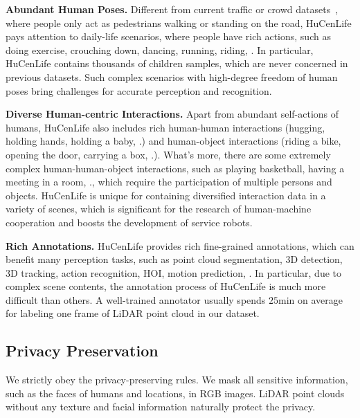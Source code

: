 \textbf{Abundant Human Poses.} 
Different from current traffic or crowd datasets~\cite{sun2020scalability,caesar2020nuscenes,cong2022stcrowd}, where people only act as pedestrians walking or standing on the road, HuCenLife pays attention to daily-life scenarios, where people have rich actions, such as doing exercise, crouching down, dancing, running, riding, \etc. In particular, HuCenLife contains thousands of children samples, which are never concerned in previous datasets. Such complex scenarios with high-degree freedom of human poses bring challenges for accurate perception and recognition.  

\textbf{Diverse Human-centric Interactions.} 
Apart from abundant self-actions of humans, HuCenLife also includes rich human-human interactions (hugging, holding hands, holding a baby, \etc.) and human-object interactions (riding a bike, opening the door, carrying a box, \etc.). What's more, there are some extremely complex human-human-object interactions, such as playing basketball, having a meeting in a room, \etc., which require the participation of multiple persons and objects. HuCenLife is unique for containing diversified interaction data in a variety of scenes, which is significant for the research of human-machine cooperation and boosts the development of service robots.

\textbf{Rich Annotations.} 
HuCenLife provides rich fine-grained annotations, which can benefit many perception tasks, such as point cloud segmentation, 3D detection, 3D tracking, action recognition, HOI, motion prediction, \etc. In particular, due to complex scene contents, the annotation process of HuCenLife is much more difficult than others. A well-trained annotator usually spends $25$min on average for labeling one frame of LiDAR point cloud in our dataset. 


\subsection{Privacy Preservation}
We strictly obey the privacy-preserving rules. We mask all sensitive information, such as the faces of humans and locations, in RGB images. LiDAR point clouds without any texture and facial information naturally protect the privacy.

